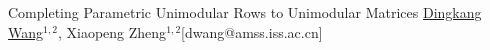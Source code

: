 \begin{abstract_online}{Completing Parametric Unimodular Rows to Unimodular Matrices}{%
        \underline{Dingkang Wang}$^{1,2}$, Xiaopeng Zheng$^{1,2}$}{[dwang@amss.iss.ac.cn]
        }
%


\end{abstract_online}
